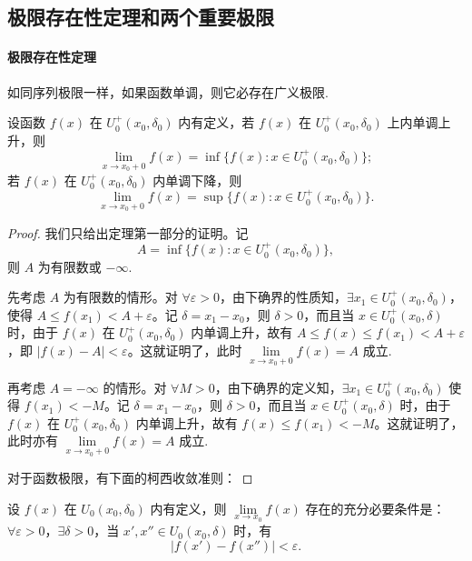 \subsection{极限存在性定理和两个重要极限}
\label{subsec:ma-3-1-5}

\paragraph*{极限存在性定理}


如同序列极限一样，如果函数单调，则它必存在广义极限.

\begin{theorem}\label{theorem:ma-3-1-8}
设函数 $f(x)$ 在 $U_0^+(x_0,\delta_0)$ 内有定义，若 $f(x)$ 在 $U_0^+(x_0,\delta_0)$ 上内单调上升，则
\[
  \lim_{x\to x_0+0}f(x)=\inf\{f(x):x\in U_0^+(x_0,\delta_0)\};
\]
若 $f(x)$ 在 $U_0^+(x_0,\delta_0)$ 内单调下降，则
\[
  \lim_{x\to x_0+0}f(x)=\sup\{f(x):x\in U_0^+(x_0,\delta_0)\}.
\]
\end{theorem}


\begin{proof}
我们只给出定理第一部分的证明。记
\[
  A=\inf\{f(x):x\in U_0^+(x_0,\delta_0)\},
\]
则 $A$ 为有限数或 $-\infty$.

先考虑 $A$ 为有限数的情形。对 $\forall\varepsilon>0$，由下确界的性质知，$\exists x_1\in U_0^+(x_0,\delta_0)$，使得 $A\leqslant f(x_1)<A+\varepsilon$。记 $\delta=x_1-x_0$，则 $\delta>0$，而且当 $x\in U_0^+(x_0,\delta)$ 时，由于 $f(x)$ 在 $U_0^+(x_0,\delta_0)$ 内单调上升，故有 $A\leqslant f(x)\leqslant f(x_1)<A+\varepsilon$，即 $|f(x)-A|<\varepsilon$。这就证明了，此时 $\lim\limits_{x\to x_0+0}f(x)=A$ 成立.

再考虑 $A=-\infty$ 的情形。对 $\forall M>0$，由下确界的定义知，$\exists x_1\in U_0^+(x_0,\delta_0)$ 使得 $f(x_1)<-M$。记 $\delta=x_1-x_0$，则 $\delta>0$，而且当 $x\in U_0^+(x_0,\delta)$ 时，由于 $f(x)$ 在 $U_0^+(x_0,\delta_0)$ 内单调上升，故有 $f(x)\leqslant f(x_1)<-M$。这就证明了，此时亦有 $\lim\limits_{x\to x_0+0}f(x)=A$ 成立.

对于函数极限，有下面的柯西收敛准则：
\end{proof}


\begin{theorem}\label{theorem:ma-3-1-9}
设 $f(x)$ 在 $U_0(x_0,\delta_0)$ 内有定义，则 $\lim\limits_{x\to x_0}f(x)$ 存在的充分必要条件是：$\forall\varepsilon>0$，$\exists\delta>0$，当 $x',x''\in U_0(x_0,\delta)$ 时，有
\[
  |f(x')-f(x'')|<\varepsilon.
\]
\end{theorem}


